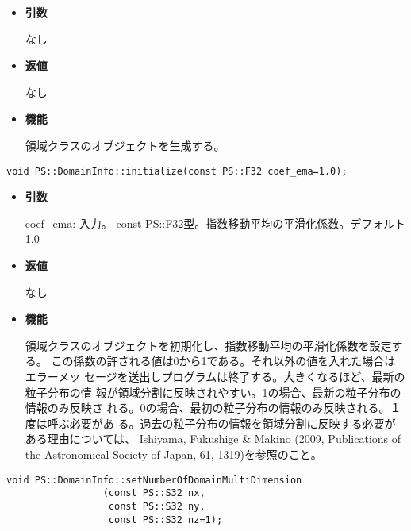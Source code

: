 \begin{itemize}

\item {\bf 引数}

なし

\item {\bf 返値}

なし

\item {\bf 機能}

領域クラスのオブジェクトを生成する。

\end{itemize}


\begin{screen}
\begin{verbatim}
void PS::DomainInfo::initialize(const PS::F32 coef_ema=1.0);
\end{verbatim}
\end{screen}

\begin{itemize}

\item {\bf 引数}

coef\_ema: 入力。 const PS::F32型。指数移動平均の平滑化係数。デフォルト1.0

\item {\bf 返値}

なし

\item {\bf 機能}

領域クラスのオブジェクトを初期化し、指数移動平均の平滑化係数を設定する。
この係数の許される値は0から1である。それ以外の値を入れた場合はエラーメッ
セージを送出しプログラムは終了する。大きくなるほど、最新の粒子分布の情
報が領域分割に反映されやすい。1の場合、最新の粒子分布の情報のみ反映さ
れる。0の場合、最初の粒子分布の情報のみ反映される。１度は呼ぶ必要があ
る。過去の粒子分布の情報を領域分割に反映する必要がある理由については、
Ishiyama, Fukushige \& Makino (2009, Publications of the Astronomical
Society of Japan, 61, 1319)を参照のこと。

\end{itemize}


\begin{screen}
\begin{verbatim}
void PS::DomainInfo::setNumberOfDomainMultiDimension
                 (const PS::S32 nx,
                  const PS::S32 ny,
                  const PS::S32 nz=1);
\end{verbatim}
\end{screen}

